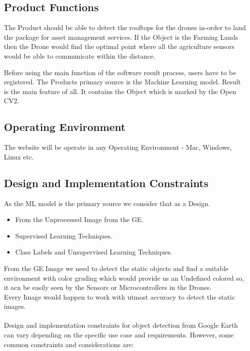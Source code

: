 	\subsection{Product Functions}
	The Product should be able to detect the rooftops for the drones in-order to land the package for asset management services. If the Object is the Farming Lands then the Drone would find the optimal point where all the agriculture sensors would be able to communicate within the distance.
	
	Before using the main function of the software result process, users have to be registered. 
	\newline
	The Products primary source is the Machine Learning model. Result is the main feature of all. It contains the Object which is marked by the Open CV2.
	
	\subsection{Operating Environment}
	The website will be operate in any Operating Environment - Mac, Windows, Linux etc. 
	
	\subsection{Design and Implementation Constraints}
	As the ML model is the primary source we consider that as a Design.
	\begin{itemize}
		\item From the Unprocessed Image from the GE.
		\item Supervised Learning Techniques.
		\item Class Labels and Unsupervised Learning Techniques.\\
	\end{itemize}


	From the GE Image we need to detect the static objects and find a suitable environment with color grading which would provide us an Undefined colored so, it acn be easily seen by the Sensors or Microcontrollers in the Drones.\\
	
	Every Image would happen to work with utmost accuracy to detect the static images.\\\\
	
	Design and implementation constraints for object detection from Google Earth can vary depending on the specific use case and requirements. However, some common constraints and considerations are:

